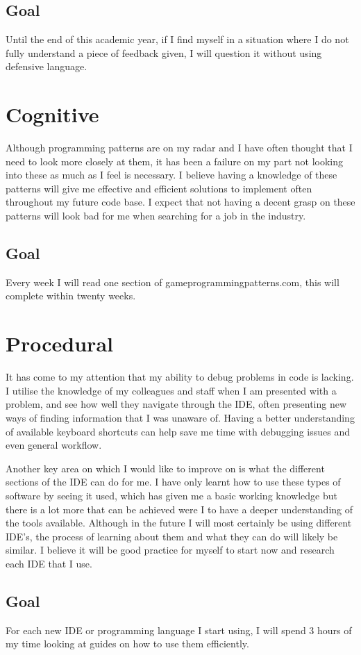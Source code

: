 \documentclass{scrartcl}
\begin{document}
\subsection{Goal}
Until the end of this academic year, if I find myself in a situation where I do not fully understand a piece of feedback given, I will question it without using defensive language.

\section{Cognitive}
Although programming patterns are on my radar and I have often thought that I need to look more closely at them, it has been a failure on my part not looking into these as much as I feel is necessary. I believe having a knowledge of these patterns will give me effective and efficient solutions to implement often throughout my future code base. I expect that not having a decent grasp on these patterns will look bad for me when searching for a job in the industry.
\subsection{Goal}
Every week I will read one section of gameprogrammingpatterns.com, this will complete within twenty weeks.

\section{Procedural}
It has come to my attention that my ability to debug problems in code is lacking. I utilise the knowledge of my colleagues and staff when I am presented with a problem, and see how well they navigate through the IDE, often presenting new ways of finding information that I was unaware of. Having a better understanding of available keyboard shortcuts can help save me time with debugging issues and even general workflow. 

Another key area on which I would like to improve on is what the different sections of the IDE can do for me. I have only learnt how to use these types of software by seeing it used, which has given me a basic working knowledge but there is a lot more that can be achieved were I to have a deeper understanding of the tools available. Although in the future I will most certainly be using different IDE's, the process of learning about them and what they can do will likely be similar. I believe it will be good practice for myself to start now and research each IDE that I use.
\subsection{Goal}
For each new IDE or programming language I start using, I will spend 3 hours of my time looking at guides on how to use them efficiently.
\end{document}
